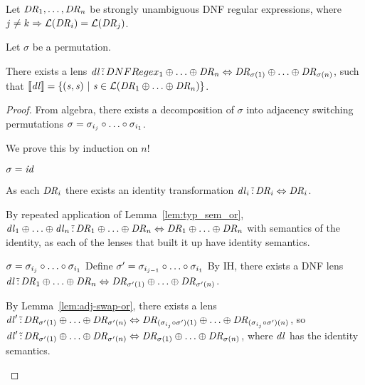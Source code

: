 \documentclass[numbers,10pt,preprint\ifanon ,nocopyrightspace\fi]{sigplanconf}
\begin{document}
\begin{lemma}
  \label{lem:perm-or}
  Let $\mathit{DR}_1,\ldots,\mathit{DR}_n$ be strongly unambiguous DNF regular
  expressions, where $j \neq k \Rightarrow
  \mathcal{L}(\mathit{DR}_i) = \mathcal{L}(\mathit{DR}_j)$.

  Let $\sigma$ be a permutation.

  There exists a lens $\mathit{dl} \,\tilde{:}\, DNFRegex_1 \oplus \ldots
  \oplus \mathit{DR}_n \Leftrightarrow \mathit{DR}_{\sigma(1)} \oplus \ldots
  \oplus \mathit{DR}_{\sigma(n)}$, such that $[ \! [\mathit{dl}] \! ] =
  \{(\mathit{s},\mathit{s}) ~|~ \mathit{s} \in \mathcal{L}(\mathit{DR}_1 \oplus
      \ldots \oplus \mathit{DR}_n)\}$.
\end{lemma}
\begin{proof}
  From algebra, there exists a decomposition of $\sigma$ into adjacency
  switching permutations $\sigma = \sigma_{i_j} \circ \ldots \circ
  \sigma_{i_1}$.

  We prove this by induction on $n$!

  \begin{case}[$j=0$]
    $\sigma = \mathit{id}$

    As each $\mathit{DR}_i$ there exists an identity transformation
    $\mathit{dl}_i \,\tilde{:}\, \mathit{DR}_i \Leftrightarrow \mathit{DR}_i$.

    By repeated application of
    Lemma~\ref{lem:typ_sem_or},
    $\mathit{dl}_1 \oplus \ldots \oplus \mathit{dl}_n \,\tilde{:}\,
    \mathit{DR}_1 \oplus \ldots \oplus \mathit{DR}_n \Leftrightarrow
    \mathit{DR}_1 \oplus \ldots \oplus \mathit{DR}_n$ with semantics of the
    identity, as each of the lenses that built it up have identity semantics.
  \end{case}

  \begin{case}[$j>0$]
    $\sigma = \sigma_{i_j} \circ \ldots \circ \sigma_{i_1}$
    Define $\sigma' = \sigma_{i_{j-1}} \circ \ldots \circ \sigma_{i_1}$
    By IH, there exists a DNF lens
    $\mathit{dl} \,\tilde{:}\,
    \mathit{DR}_1 \oplus \ldots \oplus \mathit{DR}_n
    \Leftrightarrow
    \mathit{DR}_{\sigma'(1)} \oplus \ldots \oplus \mathit{DR}_{\sigma'(n)}$.

    By Lemma~\ref{lem:adj-swap-or}, there exists a lens
    $\mathit{dl}' \,\tilde{:}\,
    \mathit{DR}_{\sigma'(1)} \oplus \ldots \oplus \mathit{DR}_{\sigma'(n)}
    \Leftrightarrow
    \mathit{DR}_{(\sigma_{i_j} \circ \sigma')(1)} \oplus \ldots \oplus
    \mathit{DR}_{(\sigma_{i_j} \circ \sigma')(n)}$,
    so 
    $\mathit{dl}' \,\tilde{:}\,
    \mathit{DR}_{\sigma'(1)} \oplus \ldots \oplus \mathit{DR}_{\sigma'(n)}
    \Leftrightarrow
    \mathit{DR}_{\sigma(1)} \oplus \ldots \oplus \mathit{DR}_{\sigma(n)}$, where
    $\mathit{dl}$ has the identity semantics.


\end{case}
\end{proof}
\end{document}
